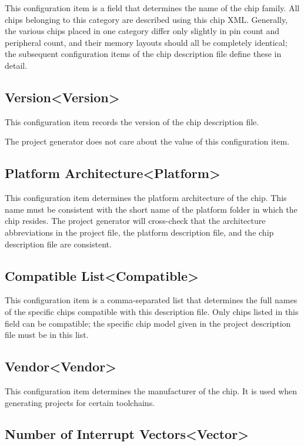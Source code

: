 This configuration item is a field that determines the name of the chip family. All chips belonging to this category are described using this chip XML. Generally, the various chips placed in one category differ only slightly in pin count and peripheral count, and their memory layouts should all be completely identical; the subsequent configuration items of the chip description file define these in detail.

\subsection{Version<Version>{}}\label{subsec:5-5-2}

This configuration item records the version of the chip description file.

The project generator does not care about the value of this configuration item.

\subsection{Platform Architecture<Platform>{}}\label{subsec:5-5-3}

This configuration item determines the platform architecture of the chip. This name must be consistent with the short name of the platform folder in which the chip resides. The project generator will cross-check that the architecture abbreviations in the project file, the platform description file, and the chip description file are consistent.

\subsection{Compatible List<Compatible>{}}\label{subsec:5-5-4}

This configuration item is a comma-separated list that determines the full names of the specific chips compatible with this description file. Only chips listed in this field can be compatible; the specific chip model given in the project description file must be in this list.

\subsection{Vendor<Vendor>{}}\label{subsec:5-5-5}

This configuration item determines the manufacturer of the chip. It is used when generating projects for certain toolchains.

\subsection{Number of Interrupt Vectors<Vector>{}}\label{subsec:5-5-6}

